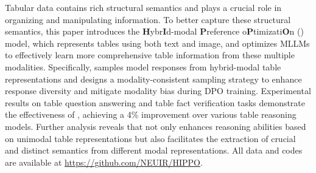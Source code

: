 Tabular data contains rich structural semantics and plays a crucial role in organizing and manipulating information. To better capture these structural semantics, this paper introduces the \textbf{H}ybr\textbf{I}d-modal \textbf{P}reference o\textbf{P}timizati\textbf{O}n (\method{}) model, which represents tables using both text and image, and optimizes MLLMs to effectively learn more comprehensive table information from these multiple modalities. Specifically, \method{} samples model responses from hybrid-modal table representations and designs a modality-consistent sampling strategy to enhance response diversity and mitigate modality bias during DPO training. Experimental results on table question answering and table fact verification tasks demonstrate the effectiveness of \method{}, achieving a 4\% improvement over various table reasoning models. Further analysis reveals that \method{} not only enhances reasoning abilities based on unimodal table representations but also facilitates the extraction of crucial and distinct semantics from different modal representations. All data and codes are available at \url{https://github.com/NEUIR/HIPPO}.